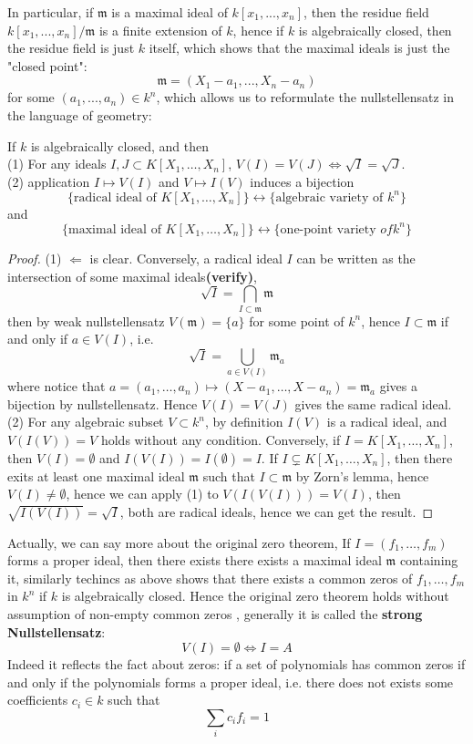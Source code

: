 \documentclass[12pt,a4paper]{article}
\begin{document}
In particular, if \(\mathfrak{m}\) is a maximal ideal of \(k[x_1,...,x_n]\), then the residue field \(k[x_1,...,x_n]/\mathfrak{m}\) is a finite extension of \(k\), hence if \(k\) is algebraically closed, then the residue field is just \(k\) itself, which shows that the maximal ideals is just the "closed point":     \[\mathfrak{m} = (X_1 - a_1,...,X_n - a_n)\]
for some \((a_1,...,a_n) \in k^n\), which allows us to reformulate the nullstellensatz in the language of geometry:
\begin{corollary}
    If \(k\) is algebraically closed, and then\\
    (1) For any ideals \(I,J \subset K[X_1,\dots,X_n]\), \(V(I) = V(J) \iff \sqrt{I} = \sqrt{J}\).\\
    (2) application \(I \mapsto V(I)\) and \(V \mapsto I(V)\) induces a bijection
    \[\{\text{radical ideal of } K[X_1,\dots,X_n]\} \longleftrightarrow \{\text{algebraic variety of } k^n\}\]
    and
    \[\{\text{maximal ideal of } K[X_1,\dots,X_n]\} \longleftrightarrow \{\text{one-point variety } of k^n\}\]
\end{corollary}
\begin{proof}
    (1) \(\Leftarrow\) is clear. Conversely, a radical ideal \(I\) can be written as the intersection of some maximal ideals\textbf{(verify)},
    \[\sqrt{I} = \bigcap_{I \subset \mathfrak{m} } \mathfrak{m}\]
    then by weak nullstellensatz \(V(\mathfrak{m}) = \{a\}\) for some point of \(k^n\), hence \(I \subset \mathfrak{m}\) if and only if \(a \in V(I)\), i.e.
    \[\sqrt{I} = \bigcup_{a \in V(I)} \mathfrak{m}_a\]
    where notice that \(a=(a_1,\dots,a_n) \mapsto (X-a_1,\dots,X-a_n) = \mathfrak{m}_a\) gives a bijection by nullstellensatz. Hence \(V(I) = V(J)\) gives the same radical ideal.\\

    (2) For any algebraic subset \(V \subset k^n\), by definition \(I(V)\) is a radical ideal, and \(V(I(V)) = V\) holds without any condition. Conversely, if \(I = K[X_1,\dots,X_n]\), then \(V(I) = \emptyset\) and \(I(V(I)) = I(\emptyset) = I\). If \(I \subsetneq K[X_1,\dots,X_n]\), then there exits at least one maximal ideal \(\mathfrak{m}\) such that \(I \subset \mathfrak{m}\) by Zorn's lemma, hence \(V(I) \neq \emptyset\), hence we can apply (1) to \(V(I(V(I))) = V(I)\), then \(\sqrt{I(V(I))} = \sqrt{I}\), both are radical ideals, hence we can get the result.
\end{proof}
\begin{remark}
    Actually, we can say more about the original zero theorem, If \(I = (f_1,\dots,f_m)\) forms a proper ideal, then there exists there exists a maximal ideal \(\mathfrak{m}\) containing it, similarly techincs as above shows that there exists a common zeros of \(f_1,\dots,f_m\) in \(k^n\) if \(k\) is algebraically closed. Hence the original zero theorem holds without assumption of non-empty common zeros , generally it is called the \textbf{strong Nullstellensatz}:
    \[V(I) = \emptyset \iff I = A\]
    Indeed it reflects the fact about zeros: if a set of polynomials has common zeros if and only if the polynomials forms a proper ideal, i.e. there does not exists some coefficients \(c_i \in k\) such that \[\sum_i c_i f_i = 1\]
\end{remark}
\end{document}
